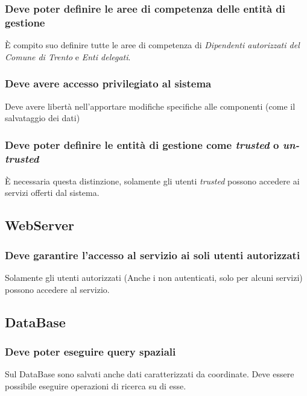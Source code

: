 \documentclass{article}
\begin{document}
\subsubsection{Deve poter definire le aree di competenza delle entità di gestione}
\label{5.5.2}
È compito suo definire tutte le aree di competenza di \textit{Dipendenti autorizzati del Comune di Trento} e \textit{Enti delegati}.

\subsubsection{Deve avere accesso privilegiato al sistema}
\label{5.5.3}
Deve avere libertà nell'apportare modifiche specifiche alle componenti (come il salvataggio dei dati)

\subsubsection{Deve poter definire le entità di gestione come \textit{trusted} o \textit{un-trusted}}
\label{5.5.4}
È necessaria questa distinzione, solamente gli utenti \textit{trusted} possono accedere ai servizi offerti dal sistema.

\subsection{WebServer}

\subsubsection{Deve garantire l'accesso al servizio ai soli utenti autorizzati}
\label{5.6.1}
Solamente gli utenti autorizzati (Anche i non autenticati, solo per alcuni servizi) possono accedere al servizio.

\subsection{DataBase}

\subsubsection{Deve poter eseguire query spaziali}
\label{5.7.1}
Sul DataBase sono salvati anche dati caratterizzati da coordinate. Deve essere possibile eseguire operazioni di ricerca su di esse.
\end{document}
